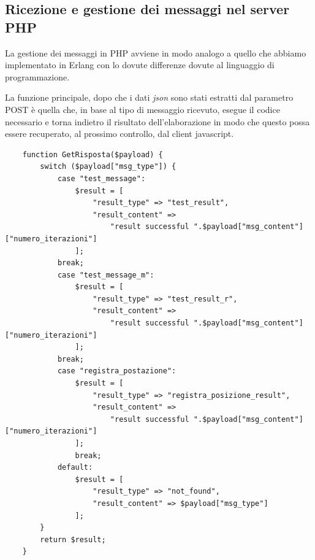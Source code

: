 \subsection{Ricezione e gestione dei messaggi nel server PHP}
La gestione dei messaggi in PHP avviene in modo analogo a quello che abbiamo implementato in Erlang con lo dovute differenze dovute al linguaggio di programmazione.

La funzione principale, dopo che i dati \textit{json} sono stati estratti dal parametro POST \`e quella che, in base al tipo di messaggio ricevuto, esegue il codice necessario e torna indietro il risultato dell'elaborazione in modo che questo possa essere recuperato, al prossimo controllo, dal client javascript.

\begin{verbatim}
	function GetRisposta($payload) {
		switch ($payload["msg_type"]) {
			case "test_message":
				$result = [
					"result_type" => "test_result",
					"result_content" => 
						"result successful ".$payload["msg_content"]["numero_iterazioni"]
				];
			break;
			case "test_message_m":
				$result = [
					"result_type" => "test_result_r",
					"result_content" => 
						"result successful ".$payload["msg_content"]["numero_iterazioni"]
				];
			break;
			case "registra_postazione":
				$result = [
					"result_type" => "registra_posizione_result",
					"result_content" => 
						"result successful ".$payload["msg_content"]["numero_iterazioni"]
				];
				break;
			default:
				$result = [
					"result_type" => "not_found",
					"result_content" => $payload["msg_type"]
				];
		} 
		return $result;
	}
	
\end{verbatim}


